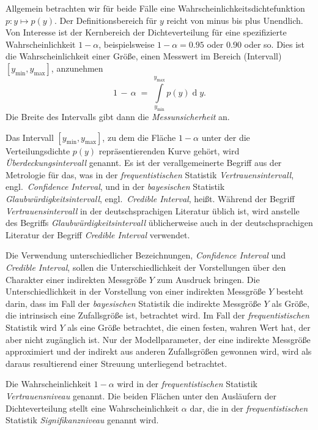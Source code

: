 Allgemein betrachten wir für beide Fälle eine Wahrscheinlichkeitsdichtefunktion $p \! : y \mapsto p(y)$.
Der Definitionsbereich für $y$ reicht von minus bis plus Unendlich. Von Interesse ist der Kernbereich
der Dichteverteilung für eine spezifizierte Wahrscheinlichkeit $1-\alpha$, beispielsweise
$1-\alpha = 0.95$ oder $0.90$ oder so.
Dies ist die Wahrscheinlichkeit einer Größe, einen Messwert im Bereich (Intervall) $[y_\mathrm{min}, y_\mathrm{max}]$,
anzunehmen
\begin{equation}
1 \, - \, \alpha \; = \; 
\int\limits_{y_\mathrm{min}}^{y_\mathrm{max}} p(y) 
\operatorname{d}y .
\label{UeberdeckungWahrscheinlichkeit}
\end{equation}
Die Breite des Intervalls gibt dann die \textsl{Messunsicherheit} an.

Das Intervall $[y_\mathrm{min}, y_\mathrm{max}]$, zu dem die Fläche $1 - \alpha$ unter der die
Verteilungsdichte $p(y)$ repräsentierenden Kurve gehört, wird \textsl{Überdeckungsintervall} genannt.
Es ist der verallgemeinerte Begriff aus der Metrologie für das, was in der
\textsl{frequentistischen} Statistik \textsl{Vertrauensintervall},
engl.\  \textsl{Confidence Interval}, und in der \textsl{bayesischen} Statistik 
\textsl{Glaubwürdigkeitsintervall}, engl.\ \textsl{Credible Interval},
heißt. Während der Begriff \textsl{Vertrauensintervall} in der deutschsprachigen
Literatur üblich ist, wird anstelle des Begriffs \textsl{Glaubwürdigkeitsintervall} üblicherweise
auch in der deutschsprachigen Literatur der Begriff \textsl{Credible Interval} verwendet.

Die Verwendung unterschiedlicher Bezeichnungen, \textsl{Confidence Interval} und
\textsl{Credible Interval}, sollen die Unterschiedlichkeit der Vorstellungen
über den Charakter einer indirekten Messgröße $Y$ zum Ausdruck bringen.
Die Unterschiedlichkeit in der Vorstellung von einer indirekten Messgröße $Y$ besteht darin,
dass im Fall der \textsl{bayesischen} Statistik
die indirekte Messgröße $Y$ als Größe, die intrinsisch eine Zufallsgröße ist, betrachtet
wird. Im Fall der \textsl{frequentistischen} Statistik wird $Y$ als eine Größe betrachtet,
die einen festen, wahren Wert hat, der aber nicht zugänglich ist. Nur der
Modellparameter, der eine indirekte Messgröße approximiert und der indirekt aus anderen 
Zufallsgrößen gewonnen wird, wird als daraus resultierend einer Streuung unterliegend betrachtet.

Die Wahrscheinlichkeit $1 - \alpha$ wird in der \textsl{frequentistischen} Statistik
\textsl{Vertrauensniveau} genannt. Die beiden Flächen unter den
Ausläufern der Dichteverteilung stellt eine Wahrscheinlichkeit $\alpha$ dar, die in der
\textsl{frequentistischen} Statistik \textsl{Signifikanzniveau} genannt wird.

